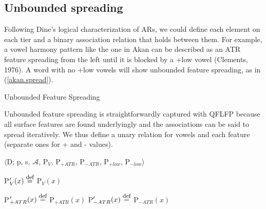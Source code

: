 \documentclass[,doc,floatsintext]{apa6}
\def\defeq{\mathrel{\buildrel \mbox{\footnotesize def} \over =}}
\theoremstyle{definition}
\theoremstyle{definition}
\theoremstyle{definition}
\theoremstyle{remark}
\begin{document}
\subsection{Unbounded spreading}\label{unbounded-spreading}

Following Dine's logical characterization of ARs, we could define each
element on each tier and a binary association relation that holds
between them. For example, a vowel harmony pattern like the one in Akan
can be described as an ATR feature spreading from the left until it is
blocked by a +low vowel (Clements, 1976). A word with no +low vowels
will show unbounded feature spreading, as in (\ref{akan.spread}).

\begin{exe}
\ex \label{akan.spread} Unbounded Feature Spreading \\
\end{exe}

\noindent Unbounded feature spreading is straightforwardly captured with
QFLFP because all surface features are found underlyingly and the
associations can be said to spread iteratively. We thus define a unary
relation for vowels and each feature (separate ones for + and - values).

\newpage

\begin{exe}
\ex\label{qflfp.spread} $\langle$D; p, s, $\mathcal{A}$, P$_V$, P$_{+ATR}$, P$_{-ATR}$, P$_{+low}$, P$_{-low}\rangle$ 
\end{exe}

P\('_{V}(x) \defeq\) P\(_{V}(x)\)

P\('_{+ATR}(x) \defeq\) P\(_{+ATR}(x)\) \hspace{2.25in}
P\('_{-ATR}(x) \defeq\) P\(_{-ATR}(x)\)
\end{document}

